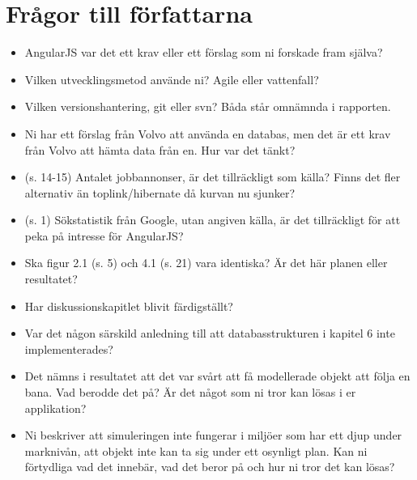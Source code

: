 \section{Frågor till författarna} %
\label{sec:fr_gor_till_f_rfattarna}

\begin{itemize}
    \item AngularJS var det ett krav eller ett förslag som ni forskade fram själva?
    \item Vilken utvecklingsmetod använde ni? Agile eller vattenfall?
    \item Vilken versionshantering, git eller svn? Båda står omnämnda i rapporten.
    \item Ni har ett förslag från Volvo att använda en databas, men det är ett krav från Volvo att hämta data från en. Hur var det tänkt?
    \item (s. 14-15) Antalet jobbannonser, är det tillräckligt som källa? Finns det fler alternativ än toplink/hibernate då kurvan nu sjunker?
    \item (s. 1) Sökstatistik från Google, utan angiven källa, är det tillräckligt för att peka på intresse för AngularJS?
    \item Ska figur 2.1 (s. 5) och 4.1 (s. 21) vara identiska?  Är det här planen eller resultatet?
    \item Har diskussionskapitlet blivit färdigställt?
    \item Var det någon särskild anledning till att databasstrukturen i kapitel 6 inte implementerades?
    \item Det nämns i resultatet att det var svårt att få modellerade objekt att följa en bana. Vad berodde det på? Är det något som ni tror kan lösas i er applikation?
    \item Ni beskriver att simuleringen inte fungerar i miljöer som har ett djup under marknivån, att objekt inte kan ta sig under ett osynligt plan. Kan ni förtydliga vad det innebär, vad det beror på och hur ni tror det kan lösas?

\end{itemize}

